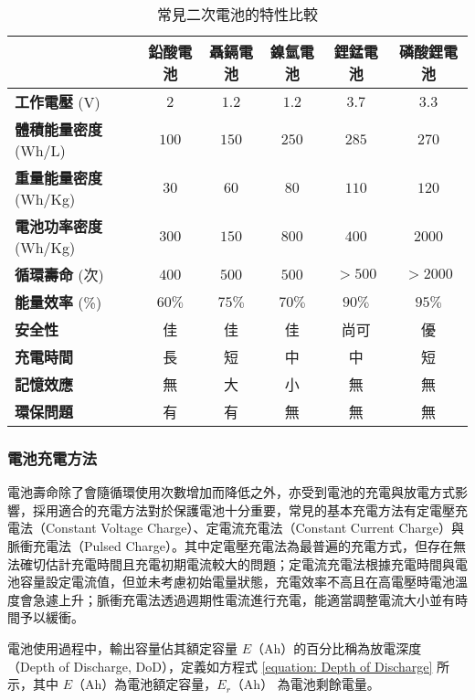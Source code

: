 \begin{table}[htp]
  \centering
  \caption[常見二次電池的特性比較]{常見二次電池的特性比較}
  \begin{tabular*}{\textwidth}{lccccc}
    \toprule
     & \textbf{鉛酸電池} & \textbf{聶鎘電池} & \textbf{鎳氫電池} & \textbf{鋰錳電池} & \textbf{磷酸鋰電池} \\
    \midrule
    \textbf{工作電壓} (V) & $2$ & $1.2$ & $1.2$ & $3.7$ & $3.3$ \\
    \textbf{體積能量密度} (Wh/L) & $100$ & $150$ & $250$ & $285$ & $270$ \\
    \textbf{重量能量密度} (Wh/Kg) & $30$ & $60$ & $80$ & $110$ & $120$ \\
    \textbf{電池功率密度} (Wh/Kg) & $300$ & $150$ & $800$ & $400$ & $2000$ \\
    \textbf{循環壽命} (次) & $400$ & $500$ & $500$ & $> 500$ & $> 2000$ \\
    \textbf{能量效率} (\%) & $60\%$ & $75\%$  & $70\%$ & $90\%$ & $95\%$ \\
    \textbf{安全性} & 佳 & 佳 & 佳 & 尚可 & 優 \\
    \textbf{充電時間} & 長 & 短 & 中 & 中 & 短 \\
    \textbf{記憶效應} & 無 & 大 & 小 & 無 & 無 \\
    \textbf{環保問題} & 有 & 有 & 無 & 無 & 無 \\
    \bottomrule
  \end{tabular*}
  \label{table: EV Battery}
\end{table}

\subsubsection{電池充電方法}

電池壽命除了會隨循環使用次數增加而降低之外，亦受到電池的充電與放電方式影響，採用適合的充電方法對於保護電池十分重要，常見的基本充電方法有定電壓充電法（Constant Voltage Charge）、定電流充電法（Constant Current Charge）與脈衝充電法（Pulsed Charge）。其中定電壓充電法為最普遍的充電方式，但存在無法確切估計充電時間且充電初期電流較大的問題；定電流充電法根據充電時間與電池容量設定電流值，但並未考慮初始電量狀態，充電效率不高且在高電壓時電池溫度會急遽上升；脈衝充電法透過週期性電流進行充電，能適當調整電流大小並有時間予以緩衝。

電池使用過程中，輸出容量佔其額定容量 $E$（$\text{Ah}$）的百分比稱為放電深度（Depth of Discharge, DoD），定義如方程式 \eqref{equation: Depth of Discharge} 所示，其中 $E$（$\text{Ah}$）為電池額定容量，$E_{r}$（$\text{Ah}$） 為電池剩餘電量。

